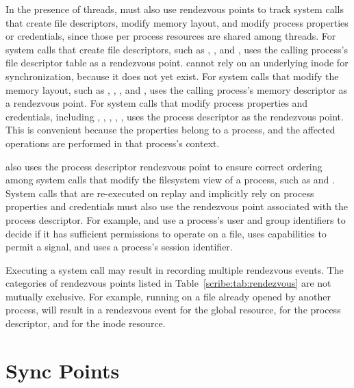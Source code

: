 \begin{table}[]
In the presence of threads, \scribe{} must also use rendezvous points
to track system calls that create file descriptors, modify memory
layout, and modify process properties or credentials, since those
per process resources are shared among threads.  
For system calls that create file descriptors, such as
, , and , \scribe{} uses the calling
process's file descriptor table as a rendezvous point.  \scribe{}
cannot rely on an underlying inode for synchronization, because it
does not yet exist.  
For system calls that modify the memory layout, such as ,
, , and , \scribe{}
uses the calling process's memory descriptor as a rendezvous point.  
For system calls that modify process properties and credentials,
including , , , ,
, \scribe{} uses the process descriptor as the
rendezvous point.  This is convenient because the properties belong to
a process, and the affected operations are performed in that process's
context. 

\scribe{} also uses the process descriptor rendezvous point
to ensure correct ordering among system calls that modify the
filesystem view of a process, such as  and .
System calls that are re-executed on replay and
implicitly rely on process properties and credentials must also use the
rendezvous point associated with the process descriptor. For example,
 and  use a process's user and group
identifiers to decide if it has sufficient permissions to operate on a
file,  uses capabilities to permit a signal, and
 uses a process's session identifier. 

Executing a system call may result in recording multiple
rendezvous events.  The categories of rendezvous points listed in
Table~\ref{scribe:tab:rendezvous} are not mutually exclusive.  For example,
running  on a file already opened by another process, will
result in a rendezvous event for the global resource, for the process
descriptor, and for the inode resource.  

\section{Sync Points}
\label{scribe:sec:sync}

\begin{figure}[t]
  \small
  \begin{center}
  \begin{tabular}{llll|l}


\end{tabular}
\end{center}
\end{figure}
\end{table}
